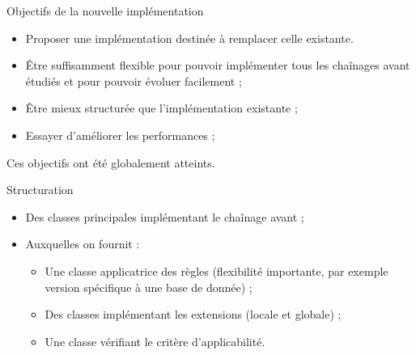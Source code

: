 \begin{frame}{Objectifs de la nouvelle implémentation}
    \begin{itemize}
        \item Proposer une implémentation destinée à remplacer celle existante.
        \item Être suffisamment flexible pour pouvoir implémenter tous les chaînages avant étudiés et pour pouvoir évoluer facilement ;
        \item Être mieux structurée que l'implémentation existante ;
        \item Essayer d'améliorer les performances ;
    \end{itemize}
    Ces objectifs ont été globalement atteints.
\end{frame}

\begin{frame}{Structuration}
    \begin{itemize}
        \item Des classes principales implémentant le chaînage avant ;
        \item Auxquelles on fournit :
        \begin{itemize}
            \item Une classe applicatrice des règles (flexibilité importante, par exemple version spécifique à une base de donnée) ;
            \item Des classes implémentant les extensions (locale et globale) ;
            \item Une classe vérifiant le critère d'applicabilité.
        \end{itemize}
    \end{itemize}
\end{frame}
